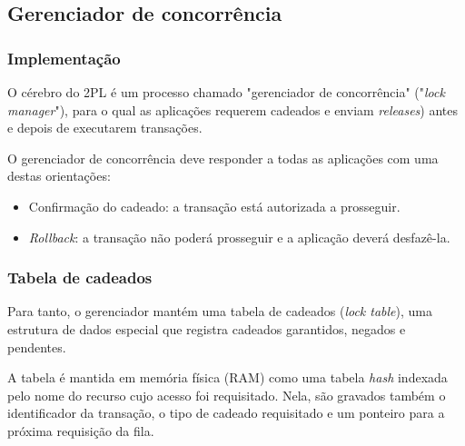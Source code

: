\documentclass{beamer}
\begin{document}

\subsection{Gerenciador de concorrência}

\begin{frame} %
    \frametitle{Implementação}

    O cérebro do 2PL é um processo chamado "gerenciador de concorrência" ("\emph{lock manager}"), para o qual as aplicações requerem cadeados e enviam \emph{releases}) antes e depois de executarem transações.

    \medskip
    O gerenciador de concorrência deve responder a todas as aplicações com uma destas orientações:

    \begin{itemize}
        \item Confirmação do cadeado: a transação está autorizada a prosseguir.
        \item \emph{Rollback}: a transação não poderá prosseguir e a aplicação deverá desfazê-la.
    \end{itemize}
\end{frame}


\begin{frame} %
    \frametitle{Tabela de cadeados}
    Para tanto, o gerenciador mantém uma tabela de cadeados (\emph{lock table}), uma estrutura de dados especial que registra cadeados garantidos, negados e pendentes.

    \medskip
    A tabela é mantida em memória física (RAM) como uma tabela \emph{hash} indexada pelo nome do recurso cujo acesso foi requisitado. Nela, são gravados também o identificador da transação, o tipo de cadeado requisitado e um ponteiro para a próxima requisição da fila.
\end{frame}
\end{document}
